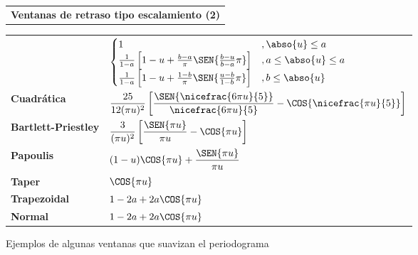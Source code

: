 \begin{SidewaysTable}
\centering
{}
\begin{tabular}{c}
\textbf{Ventanas de retraso tipo escalamiento (2)}
\vspace{1em}
\end{tabular}

{
\begin{tabular}{ll}
\toprule
{
\textbf{Neave} &
$\displaystyle 
\begin{cases}
1 &, \abso{u}\leq a \\
\frac{1}{1-a}\left[ 1-u +\frac{b-a}{\pi}\SEN{\frac{b-u}{b-a}\pi} \right] &, a \leq \abso{u}\leq a \\
\frac{1}{1-a}\left[ 1-u +\frac{1-b}{\pi}\SEN{\frac{u-b}{1-b}\pi} \right] &, b \leq \abso{u} \\
\end{cases}
$
\\
\rowcolor{gris}
\textbf{Cuadrática} &
$\displaystyle 
\frac{25}{12(\pi u)^{2}} 
\left[ \frac{\SEN{\nicefrac{6 \pi u}{5}}}{\nicefrac{6\pi u}{5}} - \COS{\nicefrac{\pi u}{5}} \right]
$
\\
\textbf{Bartlett-Priestley}} &
$\displaystyle 
\frac{3}{(\pi u)^{2}} \left[ \frac{\SEN{\pi u}}{\pi u} - \COS{\pi u} \right]
$
\\
\rowcolor{gris}
\textbf{Papoulis} &
$\displaystyle 
(1-u)\COS{\pi u} + \frac{\SEN{\pi u }}{\pi u }
$
\\
\textbf{Taper} &
$\displaystyle 
\COS{\pi u}
$
\\
\rowcolor{gris}
\textbf{Trapezoidal} &
$\displaystyle 
1 -2a +2a \COS{\pi u}
$
\\
\textbf{Normal} &
$\displaystyle 
1 -2a +2a \COS{\pi u}
$
\\
\bottomrule
\end{tabular}
}
\caption{Ejemplos de algunas ventanas que suavizan el periodograma}
\label{ventanas}
\end{SidewaysTable}


